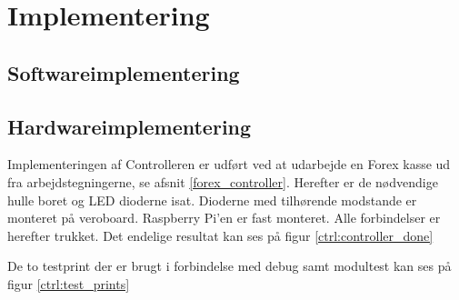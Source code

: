 \section{Implementering}

\subsection{Softwareimplementering}


\subsection{Hardwareimplementering}

Implementeringen af Controlleren er udført ved at udarbejde en Forex kasse ud fra arbejdstegningerne, se afsnit \ref{forex_controller}. Herefter er de nødvendige hulle boret og LED dioderne isat. Dioderne med tilhørende modstande er monteret på veroboard. Raspberry Pi'en er fast monteret. Alle forbindelser er herefter trukket.
Det endelige resultat kan ses på figur \ref{ctrl:controller_done}


De to testprint der er brugt i forbindelse med debug samt modultest kan ses på figur \ref{ctrl:test_prints}

